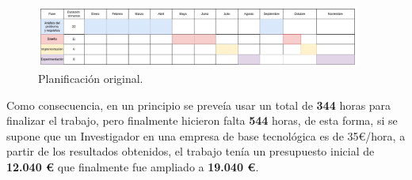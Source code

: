     \begin{figure}[!h]
        \centering
        \includegraphics[width=0.95\textwidth]{img/plan_definitivo.png}
        \caption{Planificación original.}
        \label{Fig::Planificacion final}
    \end{figure}

    \medskip

    \noindent Como consecuencia, en un principio se preveía usar un total de \textbf{344} horas para finalizar el trabajo, pero finalmente hicieron falta \textbf{544} horas, de esta forma, si se supone que un Investigador en una empresa de base tecnológica es de 35€/hora, a partir de los resultados obtenidos, el trabajo tenía un presupuesto inicial de \textbf{12.040 €} que finalmente fue ampliado a \textbf{19.040 €}.

\endinput


